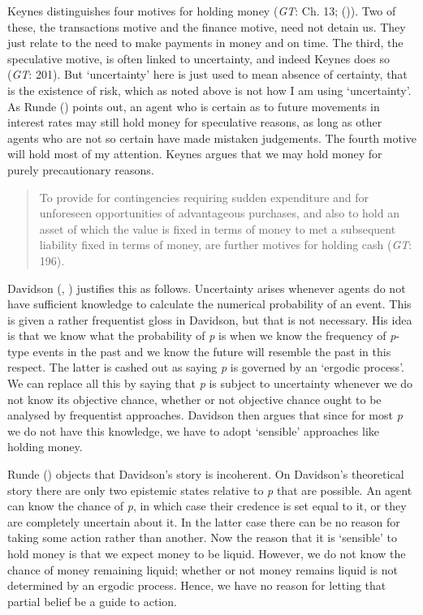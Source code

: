 \documentclass[
  10pt,
  letterpaper,
  DIV=11,
  numbers=noendperiod,
  twoside]{scrartcl}
\begin{document}
Keynes distinguishes four motives for holding money (\emph{GT}: Ch. 13;
()). Two of these, the
transactions motive and the finance motive, need not detain us. They
just relate to the need to make payments in money and on time. The
third, the speculative motive, is often linked to uncertainty, and
indeed Keynes does so (\emph{GT}: 201). But `uncertainty' here is just
used to mean absence of certainty, that is the existence of risk, which
as noted above is not how I am using `uncertainty'. As Runde
() points out, an agent who is certain
as to future movements in interest rates may still hold money for
speculative reasons, as long as other agents who are not so certain have
made mistaken judgements. The fourth motive will hold most of my
attention. Keynes argues that we may hold money for purely precautionary
reasons.

\begin{quote}
To provide for contingencies requiring sudden expenditure and for
unforeseen opportunities of advantageous purchases, and also to hold an
asset of which the value is fixed in terms of money to met a subsequent
liability fixed in terms of money, are further motives for holding cash
(\emph{GT}: 196).
\end{quote}

Davidson (,
) justifies this as follows.
Uncertainty arises whenever agents do not have sufficient knowledge to
calculate the numerical probability of an event. This is given a rather
frequentist gloss in Davidson, but that is not necessary. His idea is
that we know what the probability of \emph{p} is when we know the
frequency of \emph{p}-type events in the past and we know the future
will resemble the past in this respect. The latter is cashed out as
saying \emph{p} is governed by an `ergodic process'. We can replace all
this by saying that \emph{p} is subject to uncertainty whenever we do
not know its objective chance, whether or not objective chance ought to
be analysed by frequentist approaches. Davidson then argues that since
for most \emph{p} we do not have this knowledge, we have to adopt
`sensible' approaches like holding money.

Runde () objects that Davidson's story
is incoherent. On Davidson's theoretical story there are only two
epistemic states relative to \emph{p} that are possible. An agent can
know the chance of \emph{p}, in which case their credence is set equal
to it, or they are completely uncertain about it. In the latter case
there can be no reason for taking some action rather than another. Now
the reason that it is `sensible' to hold money is that we expect money
to be liquid. However, we do not know the chance of money remaining
liquid; whether or not money remains liquid is not determined by an
ergodic process. Hence, we have no reason for letting that partial
belief be a guide to action.
\end{document}
